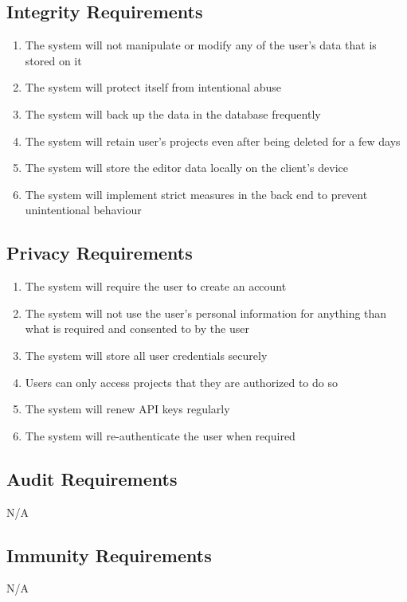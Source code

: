 \documentclass{article}
\begin{document}
	\subsection{Integrity Requirements}
	\begin{enumerate}[resume*]
		\item The system will not manipulate or modify any of the user’s data that is stored on it
		\item The system will protect itself from intentional abuse
		\item The system will back up the data in the database frequently
		\item The system will retain user's projects even after being deleted for a few days 
		\item The system will store the editor data locally on the client's device 
		\item The system will implement strict measures in the back end to prevent unintentional behaviour
	\end{enumerate}
	
	\subsection{Privacy Requirements}
	\begin{enumerate}[resume*]
		\item The system will require the user to create an account
		\item The system will not use the user's personal information for anything than what is required and consented to by the user
		\item The system will store all user credentials securely
		\item Users can only access projects that they are authorized to do so
		\item The system will renew API keys regularly
		\item The system will re-authenticate the user when required
	\end{enumerate}
	
	\subsection{Audit Requirements}
	N/A
	
	\subsection{Immunity Requirements}
	N/A
	
\end{document}
